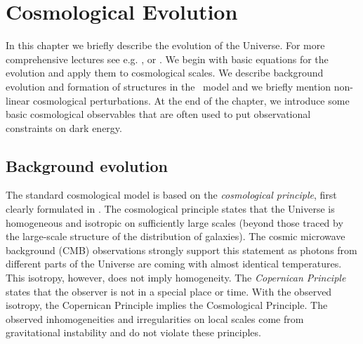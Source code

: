 \chapter{Cosmological Evolution}
\label{chpt:cosmo_evol}
In this chapter we briefly describe the evolution of the Universe. For more comprehensive lectures see e.g. \textcite{Ref:Weinberg}, \textcite{2002col.luc..cosmology} or \textcite{2010deto.book.....A}. We begin with basic equations for the evolution and apply them to cosmological scales. We describe background evolution and formation of structures in the \LCDM\ model and we briefly mention non-linear cosmological perturbations. At the end of the chapter, we introduce some basic cosmological observables that are often used to put observational constraints on dark energy.

\section{Background evolution}
The standard cosmological model is based on the \textit{cosmological principle}, first clearly formulated in \textcite{1687pnpm.book.....N}. The cosmological principle states that the Universe is homogeneous and isotropic on sufficiently large scales (beyond those traced by the large-scale structure of the distribution of galaxies). The cosmic microwave background (CMB) observations strongly support this statement as photons from different parts of the Universe are coming with almost identical temperatures. This isotropy, however, does not imply homogeneity. The \textit{Copernican Principle} states that the observer is not in a special place or time. With the observed isotropy, the Copernican Principle implies the Cosmological Principle. The observed inhomogeneities and irregularities on local scales come from gravitational instability and do not violate these principles.






